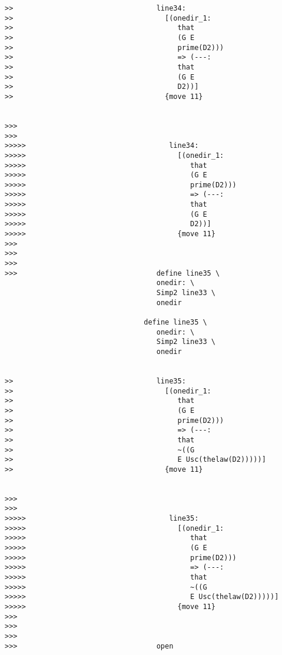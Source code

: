 \documentclass[12pt]{article}
\begin{document}
\begin{verbatim}
>>                                  line34:
>>                                    [(onedir_1:
>>                                       that
>>                                       (G E
>>                                       prime(D2)))
>>                                       => (---:
>>                                       that
>>                                       (G E
>>                                       D2))]
>>                                    {move 11}


>>>
>>>
>>>>>                                  line34:
>>>>>                                    [(onedir_1:
>>>>>                                       that
>>>>>                                       (G E
>>>>>                                       prime(D2)))
>>>>>                                       => (---:
>>>>>                                       that
>>>>>                                       (G E
>>>>>                                       D2))]
>>>>>                                    {move 11}
>>>
>>>
>>>
>>>                                 define line35 \
                                    onedir: \
                                    Simp2 line33 \
                                    onedir

                                 define line35 \
                                    onedir: \
                                    Simp2 line33 \
                                    onedir


>>                                  line35:
>>                                    [(onedir_1:
>>                                       that
>>                                       (G E
>>                                       prime(D2)))
>>                                       => (---:
>>                                       that
>>                                       ~((G
>>                                       E Usc(thelaw(D2)))))]
>>                                    {move 11}


>>>
>>>
>>>>>                                  line35:
>>>>>                                    [(onedir_1:
>>>>>                                       that
>>>>>                                       (G E
>>>>>                                       prime(D2)))
>>>>>                                       => (---:
>>>>>                                       that
>>>>>                                       ~((G
>>>>>                                       E Usc(thelaw(D2)))))]
>>>>>                                    {move 11}
>>>
>>>
>>>
>>>                                 open


\end{verbatim}
\end{document}
